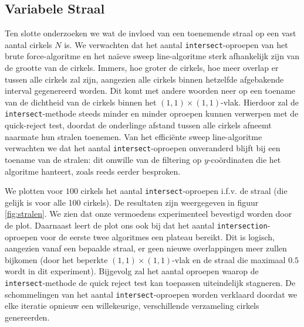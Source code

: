 \documentclass[12pt]{article}
\begin{document}
\subsection{Variabele Straal}
Ten slotte onderzoeken we wat de invloed van een toenemende straal op een vast aantal cirkels $N$ is. We verwachten dat het aantal \texttt{intersect}-oproepen van het brute force-algoritme en het naïeve sweep line-algoritme sterk afhankelijk zijn van de grootte van de cirkels. Immers, hoe groter de cirkels, hoe meer overlap er tussen alle cirkels zal zijn, aangezien alle cirkels binnen hetzelfde afgebakende interval gegenereerd worden. Dit komt met andere woorden neer op een toename van de dichtheid van de cirkels binnen het $(1,1) \times (1,1)$-vlak. Hierdoor zal de \texttt{intersect}-methode steeds minder en minder oproepen kunnen verwerpen met de quick-reject test, doordat de onderlinge afstand tussen alle cirkels afneemt naarmate hun stralen toenemen. Van het efficiënte sweep line-algoritme verwachten we dat het aantal \texttt{intersect}-oproepen onveranderd blijft bij een toename van de stralen: dit omwille van de filtering op $y$-coördinaten die het algoritme hanteert, zoals reeds eerder besproken.

We plotten voor $100$ cirkels het aantal \texttt{intersect}-oproepen i.f.v. de straal (die gelijk is voor alle 100 cirkels). De resultaten zijn weergegeven in figuur \ref{fig:stralen}. We zien dat onze vermoedens experimenteel bevestigd worden door de plot. Daarnaast leert de plot ons ook bij dat het aantal \texttt{intersection}-oproepen voor de eerste twee algoritmes een plateau bereikt. Dit is logisch, aangezien vanaf een bepaalde straal, er geen nieuwe overlappingen meer zullen bijkomen (door het beperkte $(1,1) \times (1,1)$-vlak en de straal die maximaal $0.5$ wordt in dit experiment). Bijgevolg zal het aantal oproepen waarop de \texttt{intersect}-methode de quick reject test kan toepassen uiteindelijk stagneren. De schommelingen van het aantal \texttt{intersect}-oproepen worden verklaard doordat we elke iteratie opnieuw een willekeurige, verschillende verzameling cirkels genereerden.
\end{document}
